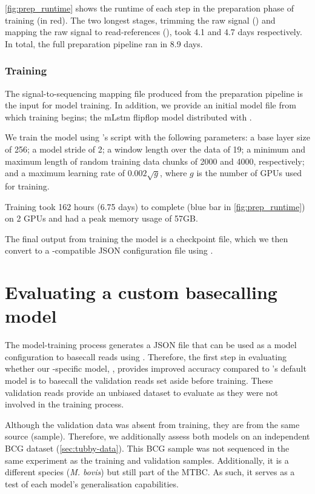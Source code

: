 \autoref{fig:prep_runtime} shows the runtime of each step in the preparation phase of training (in red). The two longest stages, trimming the raw signal () and mapping the raw signal to read-references (), took 4.1 and 4.7 days respectively. In total, the full preparation pipeline ran in 8.9 days. 

\subsubsection{Training}

The signal-to-sequencing mapping file produced from the preparation pipeline is the input for model training. In addition, we provide an initial model file from which training begins; the mLstm flipflop model distributed with \taiyaki{}.

We train the model using \taiyaki{}'s  script with the following parameters: a base layer size of 256; a model stride of 2; a window length over the data of 19; a minimum and maximum length of random training data chunks of 2000 and 4000, respectively; and a maximum learning rate of $0.002\sqrt{g}$, where $g$ is the number of GPUs used for training. 

Training took 162 hours (6.75 days) to complete (blue bar in \autoref{fig:prep_runtime}) on 2 GPUs and had a peak memory usage of 57GB. 

The final output from training the model is a checkpoint file, which we then convert to a \guppy{}-compatible JSON configuration file using \taiyaki{}.

\section{Evaluating a custom \ont{} basecalling model}

The model-training process generates a JSON file that can be used as a model configuration to basecall \ont{} reads using \guppy{}. Therefore, the first step in evaluating whether our \mtb{}-specific model, \tubby{}, provides improved accuracy compared to \guppy{}'s default model is to basecall the validation reads set aside before training. These validation reads provide an unbiased dataset to evaluate as they were not involved in the training process. 

Although the validation data was absent from training, they are from the same source (sample). Therefore, we additionally assess both models on an independent BCG dataset (\autoref{sec:tubby-data}). This BCG sample was not sequenced in the same experiment as the training and validation samples. Additionally, it is a different species (\textit{M. bovis}) but still part of the MTBC. As such, it serves as a test of each model's generalisation capabilities. 

